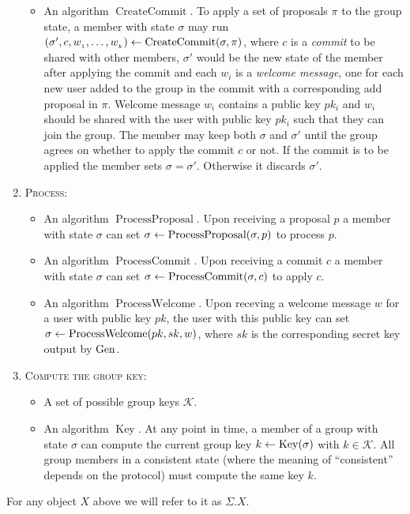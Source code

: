 \begin{definition}[CGKA]
\begin{enumerate}[1.]
\begin{itemize}
				\item An algorithm $\operatorname{CreateCommit}$. To apply a set of proposals $\pi$ to the group state, a member with state $\sigma$ may run $(\sigma', c, w_{_1}, \ldots, w_{_k}) \leftarrow \operatorname{CreateCommit}(\sigma, \pi)$, where $c$ is a \emph{commit} to be shared with other members, $\sigma'$ would be the new state of the member after applying the commit and each $w_{i}$ is a \emph{welcome message}, one for each new user added to the group in the commit with a corresponding add proposal in $\pi$. Welcome message $w_i$ contains a public key $pk_i$ and $w_i$ should be shared with the user with public key $pk_i$ such that they can join the group. The member may keep both $\sigma$ and $\sigma'$ until the group agrees on whether to apply the commit $c$ or not. If the commit is to be applied the member sets $\sigma = \sigma'$. Otherwise it discards $\sigma'$.
			\end{itemize}
		\item[] \textsc{Process:}
			\begin{itemize}
				\item An algorithm $\operatorname{ProcessProposal}$. Upon receiving a proposal $p$ a member with state $\sigma$ can set $\sigma \leftarrow \operatorname{ProcessProposal}(\sigma, p)$ to process $p$.
				\item An algorithm $\operatorname{ProcessCommit}$. Upon receiving a commit $c$ a member with state $\sigma$ can set $\sigma \leftarrow \operatorname{ProcessCommit}(\sigma, c)$ to apply $c$.
				\item An algorithm $\operatorname{ProcessWelcome}$. Upon receving a welcome message $w$ for a user with public key $pk$, the user with this public key can set $\sigma \leftarrow \operatorname{ProcessWelcome}(pk, sk, w)$, where $sk$ is the corresponding secret key output by $\mathrm{Gen}$.
			\end{itemize}
		\item[] \textsc{Compute the group key:}
			\begin{itemize}
				\item A set of possible group keys $\mathcal{K}$.
				\item An algorithm $\operatorname{Key}$. At any point in time, a member of a group with state $\sigma$ can compute the current group key $k \leftarrow \operatorname{Key}(\sigma)$ with $k \in \mathcal{K}$. All group members in a consistent state (where the meaning of ``consistent'' depends on the protocol) must compute the same key $k$.
			\end{itemize}
	\end{enumerate}
	For any object $X$ above we will refer to it as $\Sigma.X$.
\end{definition}

